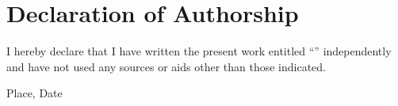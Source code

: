 \clearpage
\chapter*{Declaration of Authorship}


I hereby declare that I have written the present work entitled ``\textit{\DerTitelDerArbeit}'' independently and have not used any sources or aids other than those indicated.

\vspace{3cm}
Place, Date \hfill \DerAutorDerArbeit


